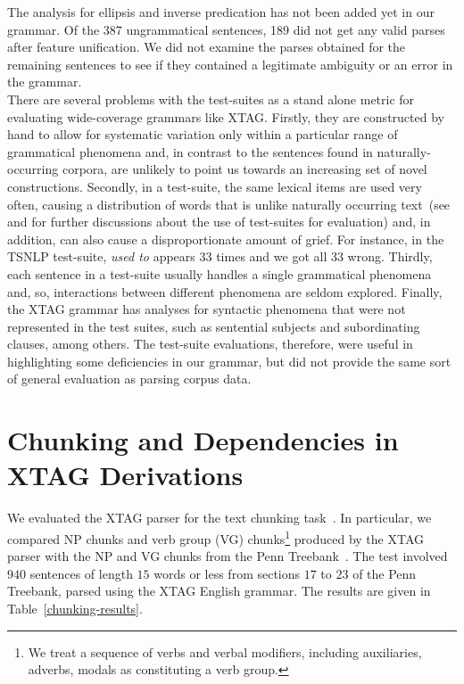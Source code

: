 The analysis for ellipsis and inverse predication has not been added yet in
our grammar. Of the 387 ungrammatical sentences, 189 did not get any valid
parses after feature unification. We did not examine the parses obtained
for the remaining sentences to see if they contained a legitimate ambiguity
or an error in the grammar.\\

There are several problems with the test-suites as a stand alone metric for
evaluating wide-coverage grammars like XTAG. Firstly, they are constructed
by hand to allow for systematic variation only within a particular range of
grammatical phenomena and, in contrast to the sentences found in
naturally-occurring corpora, are unlikely to point us towards an increasing
set of novel constructions. Secondly, in a test-suite, the same lexical
items are used very often, causing a distribution of words that is unlike
naturally occurring text~(see \cite{c.97:_maint_xtag} and
\cite{prasadandsarkar00} for further discussions about the use of
test-suites for evaluation) and, in addition, can also cause a
disproportionate amount of grief. For instance, in the TSNLP test-suite,
{\it used to} appears 33 times and we got all 33 wrong. Thirdly, each
sentence in a test-suite usually handles a single grammatical phenomena
and, so, interactions between different phenomena are seldom
explored. Finally, the XTAG grammar has analyses for syntactic phenomena
that were not represented in the test suites, such as sentential subjects
and subordinating clauses, among others. The test-suite evaluations,
therefore, were useful in highlighting some deficiencies in our grammar,
but did not provide the same sort of general evaluation as parsing corpus
data.

\section{Chunking and Dependencies in XTAG Derivations}

We evaluated the XTAG parser for the text chunking
task~\cite{abney91}. In particular, we compared NP chunks and verb
group (VG) chunks\footnote{We treat a sequence of verbs and verbal
  modifiers, including auxiliaries, adverbs, modals as constituting a
  verb group.}  produced by the XTAG parser with the NP and VG chunks
from the Penn Treebank~\cite{marcus93}. The test involved $940$
sentences of length $15$ words or less from sections $17$ to $23$ of
the Penn Treebank, parsed using the XTAG English grammar. The results
are given in Table~\ref{chunking-results}.

